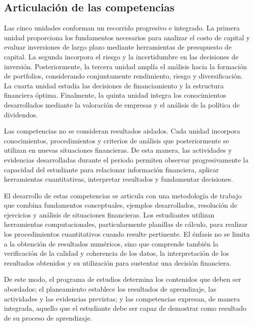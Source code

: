 \documentclass[12pt,a4paper]{article}
\begin{document}
\parencite{armoa2026valoracion,armoa2026dividendos}

\subsection{Articulación de las competencias}

Las cinco unidades conforman un recorrido progresivo e integrado. La primera unidad proporciona los fundamentos necesarios para analizar el costo de capital y evaluar inversiones de largo plazo mediante herramientas de presupuesto de capital. La segunda incorpora el riesgo y la incertidumbre en las decisiones de inversión. Posteriormente, la tercera unidad amplía el análisis hacia la formación de portfolios, considerando conjuntamente rendimiento, riesgo y diversificación. La cuarta unidad estudia las decisiones de financiamiento y la estructura financiera óptima. Finalmente, la quinta unidad integra los conocimientos desarrollados mediante la valoración de empresas y el análisis de la política de dividendos.\parencite{uaProgramaFinanzasLargoPlazo,armoa2026planeamiento}

Las competencias no se consideran resultados aislados. Cada unidad incorpora conocimientos, procedimientos y criterios de análisis que posteriormente se utilizan en nuevas situaciones financieras. De esta manera, las actividades y evidencias desarrolladas durante el periodo permiten observar progresivamente la capacidad del estudiante para relacionar información financiera, aplicar herramientas cuantitativas, interpretar resultados y fundamentar decisiones.

El desarrollo de estas competencias se articula con una metodología de trabajo que combina fundamentos conceptuales, ejemplos desarrollados, resolución de ejercicios y análisis de situaciones financieras. Los estudiantes utilizan herramientas computacionales, particularmente planillas de cálculo, para realizar los procedimientos cuantitativos cuando resulte pertinente. El énfasis no se limita a la obtención de resultados numéricos, sino que comprende también la verificación de la calidad y coherencia de los datos, la interpretación de los resultados obtenidos y su utilización para sustentar una decisión financiera.

De este modo, el programa de estudios determina los contenidos que deben ser abordados; el planeamiento establece los resultados de aprendizaje, las actividades y las evidencias previstas; y las competencias expresan, de manera integrada, aquello que el estudiante debe ser capaz de demostrar como resultado de su proceso de aprendizaje.
\end{document}
